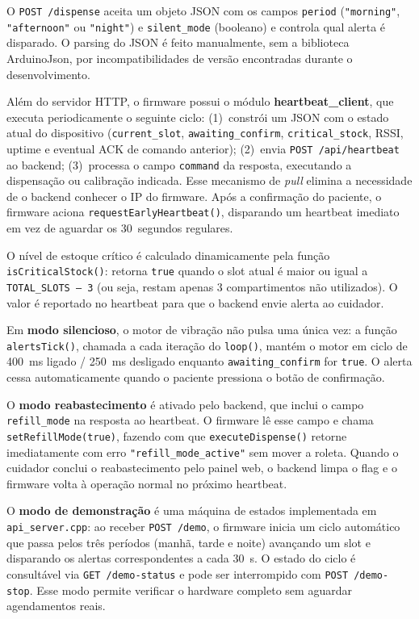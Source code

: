 \documentclass[12pt,a4paper]{article}
\begin{document}
O \texttt{POST /dispense} aceita um objeto JSON com os campos \texttt{period} (\texttt{"morning"}, \texttt{"afternoon"} ou \texttt{"night"}) e \texttt{silent\_mode} (booleano) e controla qual alerta é disparado. O parsing do JSON é feito manualmente, sem a biblioteca ArduinoJson, por incompatibilidades de versão encontradas durante o desenvolvimento.

Além do servidor HTTP, o firmware possui o módulo \textbf{heartbeat\_client}, que executa periodicamente o seguinte ciclo: (1)~constrói um JSON com o estado atual do dispositivo (\texttt{current\_slot}, \texttt{awaiting\_confirm}, \texttt{critical\_stock}, RSSI, uptime e eventual ACK de comando anterior); (2)~envia \texttt{POST /api/heartbeat} ao backend; (3)~processa o campo \texttt{command} da resposta, executando a dispensação ou calibração indicada. Esse mecanismo de \emph{pull} elimina a necessidade de o backend conhecer o IP do firmware. Após a confirmação do paciente, o firmware aciona \texttt{re\-quest\-Early\-Heart\-beat()}, disparando um heartbeat imediato em vez de aguardar os 30~segundos regulares.

O nível de estoque crítico é calculado dinamicamente pela função \texttt{isCriticalStock()}: retorna \texttt{true} quando o slot atual é maior ou igual a \texttt{TOTAL\_SLOTS\,--\,3} (ou seja, restam apenas 3 compartimentos não utilizados). O valor é reportado no heartbeat para que o backend envie alerta ao cuidador.

Em \textbf{modo silencioso}, o motor de vibração não pulsa uma única vez: a função \texttt{alertsTick()}, chamada a cada iteração do \texttt{loop()}, mantém o motor em ciclo de 400~ms ligado / 250~ms desligado enquanto \texttt{awaiting\_confirm} for \texttt{true}. O alerta cessa automaticamente quando o paciente pressiona o botão de confirmação.

O \textbf{modo reabastecimento} é ativado pelo backend, que inclui o campo \texttt{refill\_mode} na resposta ao heartbeat. O firmware lê esse campo e chama \texttt{setRefillMode(true)}, fazendo com que \texttt{executeDispense()} retorne imediatamente com erro \texttt{"refill\_mode\_active"} sem mover a roleta. Quando o cuidador conclui o reabastecimento pelo painel web, o backend limpa o flag e o firmware volta à operação normal no próximo heartbeat.

O \textbf{modo de demonstração} é uma máquina de estados implementada em \texttt{api\_server.cpp}: ao receber \texttt{POST /demo}, o firmware inicia um ciclo automático que passa pelos três períodos (manhã, tarde e noite) avançando um slot e disparando os alertas correspondentes a cada 30~s. O estado do ciclo é consultável via \texttt{GET /demo-status} e pode ser interrompido com \texttt{POST /demo-stop}. Esse modo permite verificar o hardware completo sem aguardar agendamentos reais.
\end{document}

